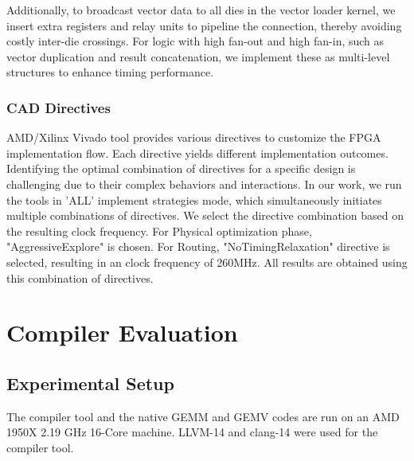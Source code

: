 \documentclass[manuscript,screen,review]{acmart}
\begin{document}
Additionally, to broadcast vector data to all dies in the vector loader kernel, we insert extra registers and relay units to pipeline the connection, thereby avoiding costly inter-die crossings. For logic with high fan-out and high fan-in, such as vector duplication and result concatenation, we implement these as multi-level structures to enhance timing performance.


\subsubsection{CAD Directives}

AMD/Xilinx Vivado tool provides various directives to customize the FPGA implementation flow. Each directive yields different implementation outcomes. Identifying the optimal combination of directives for a specific design is challenging due to their complex behaviors and interactions. In our work, we run the tools in 'ALL' implement strategies mode, which simultaneously initiates multiple combinations of directives. We select the directive combination based on the resulting clock frequency. For Physical optimization phase, "AggressiveExplore" is chosen. For Routing, "NoTimingRelaxation" directive is selected, resulting in an clock frequency of 260MHz. All results are obtained using this combination of directives.



\section{Compiler Evaluation}
\subsection{Experimental Setup}
The compiler tool and the native GEMM and GEMV codes are run on an AMD 1950X 2.19 GHz 16-Core machine. LLVM-14 and clang-14 were used for the compiler tool.  
\end{document}
